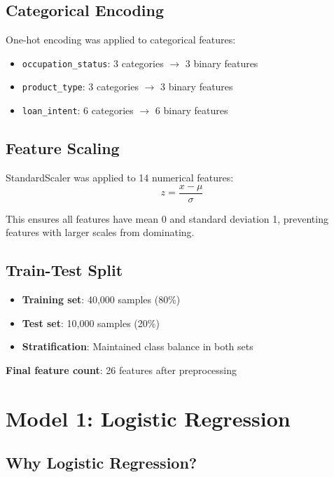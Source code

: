 \documentclass[12pt,a4paper]{article}
\begin{document}
\subsection{Categorical Encoding}

One-hot encoding was applied to categorical features:

\begin{itemize}
    \item \texttt{occupation\_status}: 3 categories $\rightarrow$ 3 binary features
    \item \texttt{product\_type}: 3 categories $\rightarrow$ 3 binary features
    \item \texttt{loan\_intent}: 6 categories $\rightarrow$ 6 binary features
\end{itemize}

\subsection{Feature Scaling}

StandardScaler was applied to 14 numerical features:
\[
z = \frac{x - \mu}{\sigma}
\]

This ensures all features have mean 0 and standard deviation 1, preventing features with larger scales from dominating.

\subsection{Train-Test Split}

\begin{itemize}
    \item \textbf{Training set}: 40,000 samples (80\%)
    \item \textbf{Test set}: 10,000 samples (20\%)
    \item \textbf{Stratification}: Maintained class balance in both sets
\end{itemize}

\textbf{Final feature count}: 26 features after preprocessing

\newpage

\section{Model 1: Logistic Regression}

\subsection{Why Logistic Regression?}
\end{document}
